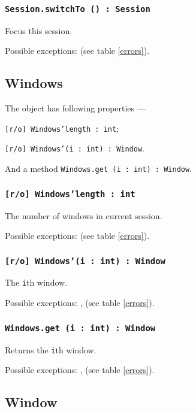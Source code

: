 \subsubsection{\texttt{Session.switchTo () : Session}}

Focus this session.

Possible exceptions:  (see table \ref{errors}).

\subsection{{\color{orange} Windows}}

The object \windows{} has following properties —
\begin{icItems}
	\item \texttt{[r/o] Windows'length : int};
	\item \texttt{[r/o] Windows'(i : int) : Window}.
\end{icItems}

And a method \texttt{Windows.get (i : int) : Window}.

\subsubsection{\texttt{[r/o] Windows'length : int}}

The number of windows in current session.

Possible exceptions:  (see table \ref{errors}).

\subsubsection{\texttt{[r/o] Windows'(i : int) : Window}}

The \texttt{i}th window.

Possible exceptions: ,  (see table \ref{errors}).

\subsubsection{\texttt{Windows.get (i : int) : Window}}

Returns the \texttt{i}th window.

Possible exceptions: ,  (see table \ref{errors}).

\subsection{{\color{orange} Window}}


